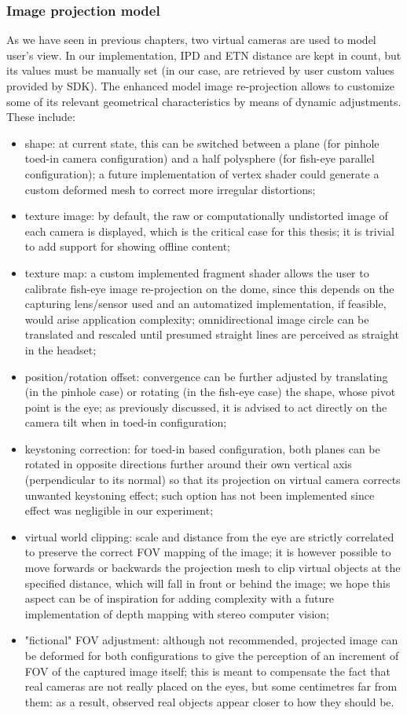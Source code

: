 \subsubsection{Image projection model}
As we have seen in previous chapters, two virtual cameras are used to model user's view. In our implementation, IPD and ETN distance are kept in count, but its values must be manually set (in our case, are retrieved by user custom values provided by SDK). The enhanced model image re-projection allows to customize some of its relevant geometrical characteristics by means of dynamic adjustments. These include:
\begin{itemize}
\item shape: at current state, this can be switched between a plane (for pinhole toed-in camera configuration) and a half polysphere (for fish-eye parallel configuration); a future implementation of vertex shader could generate a custom deformed mesh to correct more irregular distortions;
\item texture image: by default, the raw or computationally undistorted image of each camera is displayed, which is the critical case for this thesis; it is trivial to add support for showing offline content;
\item texture map: a custom implemented fragment shader allows the user to calibrate fish-eye image re-projection on the dome, since this depends on the capturing lens/sensor used and an automatized implementation, if feasible, would arise application complexity; omnidirectional image circle can be translated and rescaled until presumed straight lines are perceived as straight in the headset;
\item position/rotation offset: convergence can be further adjusted by translating (in the pinhole case) or rotating (in the fish-eye case) the shape, whose pivot point is the eye; as previously discussed, it is advised to act directly on the camera tilt when in toed-in configuration;
\item keystoning correction: for toed-in based configuration, both planes can be rotated in opposite directions further around their own vertical axis (perpendicular to its normal) so that its projection on virtual camera corrects unwanted keystoning effect; such option has not been implemented since effect was negligible in our experiment;
\item virtual world clipping: scale and distance from the eye are strictly correlated to preserve the correct FOV mapping of the image; it is however possible to move forwards or backwards the projection mesh to clip virtual objects at the specified distance, which will fall in front or behind the image; we hope this aspect can be of inspiration for adding complexity with a future implementation of depth mapping with stereo computer vision;
\item "fictional" FOV adjustment: although not recommended, projected image can be deformed for both configurations to give the perception of an increment of FOV of the captured image itself; this is meant to compensate the fact that real cameras are not really placed on the eyes, but some centimetres far from them: as a result, observed real objects appear closer to how they should be.
\end{itemize}
